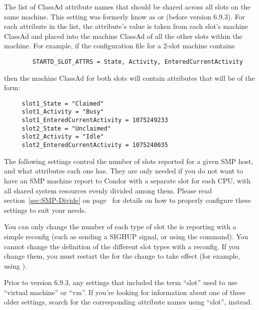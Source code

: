 \begin{description}
\label{param:StartdSlotAttrs}
\item[\Macro{STARTD\_SLOT\_ATTRS}]
  The list of ClassAd attribute names that should be shared across all
  slots on the same machine.
  This setting was formerly know as  or
   (before version 6.9.3).
  For each attribute in the list, the attribute's value is taken from
  each slot's machine ClassAd and placed into the machine
  ClassAd of all the other slots within the machine.
  For example, if the configuration file for a 2-slot machine
  contains
\begin{verbatim}
        STARTD_SLOT_ATTRS = State, Activity, EnteredCurrentActivity
\end{verbatim}
  then the machine ClassAd for both slots will contain
  attributes that will be of the form:
\begin{verbatim}
     slot1_State = "Claimed"
     slot1_Activity = "Busy"
     slot1_EnteredCurrentActivity = 1075249233
     slot2_State = "Unclaimed"
     slot2_Activity = "Idle"
     slot2_EnteredCurrentActivity = 1075240035
\end{verbatim}


\end{description}

The following settings control the number of slots reported
for a given SMP host, and what attributes each one has.  
They are only needed if you do not want to have an SMP machine report
to Condor with a separate slot for each CPU, with all
shared system resources evenly divided among them.
Please read section~\ref{sec:SMP-Divide} on
page~\pageref{sec:SMP-Divide} for details on how to properly configure
these settings to suit your needs.

\Note You can only change the number of each type of slot
the  is reporting with a simple reconfig (such as
sending a SIGHUP signal, or using the  command).
You cannot change the definition of the different slot
types with a reconfig.  
If you change them, you must restart the  for the
change to take effect (for example, using 
).

\Note Prior to version 6.9.3, any settings that included the term
``slot'' used to use ``virtual machine'' or ``vm''.
If you're looking for information about one of these older settings,
search for the corresponding attribute names using ``slot'', instead.

